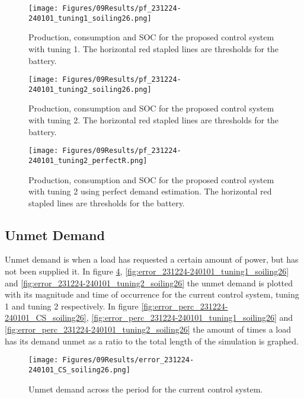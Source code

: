 \begin{figure}[h]
    \centering
    \texttt{[image: Figures/09Results/pf\_231224-240101\_tuning1\_soiling26.png]}
    \caption[Power flow proposed control system 1]{Production, consumption and SOC for the proposed control system with tuning 1. The horizontal red stapled lines are thresholds for the battery. }
    \label{fig:pf_231224-240101_tuning1_soiling26}
\end{figure}

\begin{figure}[h]
    \centering
    \texttt{[image: Figures/09Results/pf\_231224-240101\_tuning2\_soiling26.png]}
    \caption[Power flow proposed control system 2]{Production, consumption and SOC for the proposed control system with tuning 2. The horizontal red stapled lines are thresholds for the battery. }
    \label{fig:pf_231224-240101_tuning2_soiling26}
\end{figure}

\begin{figure}[h]
    \centering
    \texttt{[image: Figures/09Results/pf\_231224-240101\_tuning2\_perfectR.png]}
    \caption[Power flow proposed control system 2 perfect demand estimation]{Production, consumption and SOC for the proposed control system with tuning 2 using perfect demand estimation. The horizontal red stapled lines are thresholds for the battery. }
    \label{fig:pf_231224-240101_tuning2_perfectR}
\end{figure}

\subsection{Unmet Demand}

Unmet demand is when a load has requested a certain amount of power, but has not been supplied it. In figure \ref{fig:error_231224-240101_CS_soiling26}, \ref{fig:error_231224-240101_tuning1_soiling26} and \ref{fig:error_231224-240101_tuning2_soiling26} the unmet demand is plotted with its magnitude and time of occurrence for the current control system, tuning 1 and tuning 2 respectively. In figure \ref{fig:error_perc_231224-240101_CS_soiling26}, \ref{fig:error_perc_231224-240101_tuning1_soiling26} and \ref{fig:error_perc_231224-240101_tuning2_soiling26} the amount of times a load has its demand unmet as a ratio to the total length of the simulation is graphed.

\begin{figure}[h]
    \centering
    \texttt{[image: Figures/09Results/error\_231224-240101\_CS\_soiling26.png]}
    \caption[Unmet demand current control system]{Unmet demand across the period for the current control system. }
    \label{fig:error_231224-240101_CS_soiling26}
\end{figure}

